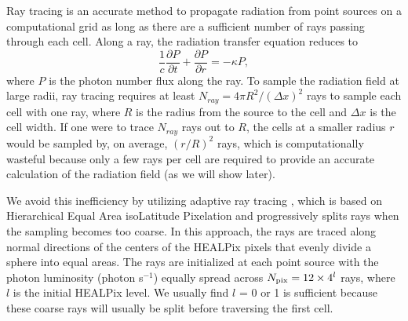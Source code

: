 Ray tracing is an accurate method to propagate radiation from point
sources on a computational grid as long as there are a sufficient
number of rays passing through each cell.  Along a ray, the radiation
transfer equation reduces to
%
\begin{equation}
\label{eqn:rtray}
\frac{1}{c} \frac{\partial P}{\partial t} + \frac{\partial P}{\partial
  r} = -\kappa P,
\end{equation}
where $P$ is the photon number flux along the ray.  To sample the
radiation field at large radii, ray tracing requires at least $N_{ray}
= 4\pi R^2 / (\Delta x)^2$ rays to sample each cell with one ray,
where $R$ is the radius from the source to the cell and $\Delta x$ is
the cell width.  If one were to trace $N_{ray}$ rays out to $R$, the
cells at a smaller radius $r$ would be sampled by, on average,
$(r/R)^2$ rays, which is computationally wasteful because only a few
rays per cell are required to provide an accurate calculation of the
radiation field (as we will show later).

We avoid this inefficiency by utilizing adaptive ray tracing
\citep{Abel02_RT}, which is based on Hierarchical Equal Area
isoLatitude Pixelation \citep[HEALPix;][]{HEALPix} and progressively
splits rays when the sampling becomes too coarse.  In this approach,
the rays are traced along normal directions of the centers of the
HEALPix pixels that evenly divide a sphere into equal areas.  The rays
are initialized at each point source with the photon luminosity
(photon s$^{-1}$) equally spread across $N_{\rm pix} = 12 \times 4^l$
rays, where $l$ is the initial HEALPix level.  We usually find $l$ = 0
or 1 is sufficient because these coarse rays will usually be split
before traversing the first cell.

